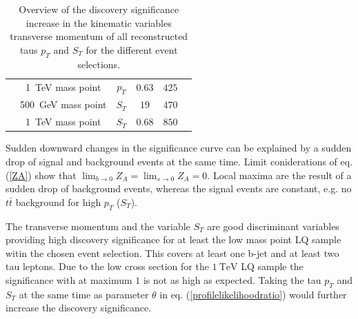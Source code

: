 \begin{table}[htbp]
\begin{tabular*}{\linewidth}{@{\extracolsep{\fill}}cccccc}
		\\
                &\SI{1}{\tera\electronvolt} mass point  &       $p_T$   & $0.63$        & $425$
                \\
                &\SI{500}{\giga\electronvolt} mass point  &       $S_T$   & $19$        & $470$
                \\
                &\SI{1}{\tera\electronvolt} mass point  &       $S_T$   & $0.68$        & $850$
                \\
                \hline
		\hline
		\end{tabular*}
		\caption[Overview of the discovery significance increase in the kinematic variables $p_T$ and $S_T$ for the different event selections.]{Overview of the discovery significance increase in the kinematic variables transverse momentum of all reconstructed taus $p_T$ and $S_T$ for the different event selections. }
		\label{xcuts}
                \renewcommand{\arraystretch}{1}
                \end{table}
%
Sudden downward changes in the significance curve can be explained by a sudden drop of signal and background events at the same time. Limit coniderations of eq. (\ref{ZA}) show that $\lim_{b\rightarrow 0}Z_A=\lim_{s\rightarrow 0}Z_A=0$. Local maxima are the result of a sudden drop of background events, whereas the signal events are constant, e.g. no $t\bar{t}$ background for high $p_T$ ($S_T$).\par
The transverse momentum and the variable $S_T$ are good discriminant variables providing high discovery significance for at least the low mass point LQ sample witin the chosen event selection. This covers at least one b-jet and at least two tau leptons. Due to the low cross section for the $\SI{1}{\tera\electronvolt}$ LQ sample the significance with at maximum $1$ is not as high as expected. Taking the tau $p_T$ and $S_T$ at the same time as parameter $\theta$ in eq. (\ref{profilelikelihoodratio}) would further increase the discovery significance.

